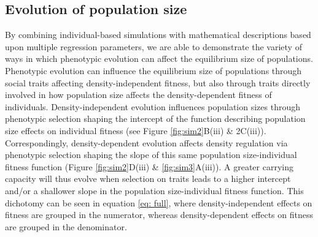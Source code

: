 \documentclass{article}
\begin{document}
\subsection{Evolution of population size}
By combining individual-based simulations with mathematical descriptions based upon multiple regression parameters, we are able to demonstrate the variety of ways in which phenotypic evolution can affect the equilibrium size of populations. Phenotypic evolution can influence the equilibrium size of populations through social traits affecting density-independent fitness, but also through traits directly involved in how population size affects the density-dependent fitness of individuals. Density-independent evolution influences population sizes through phenotypic selection shaping the intercept of the function describing population size effects on individual fitness (see Figure \ref{fig:sim2}B(iii) \& 2C(iii)). Correspondingly, density-dependent evolution affects density regulation via phenotypic selection shaping the slope of this same population size-individual fitness function (Figure \ref{fig:sim2}D(iii) \& \ref{fig:sim3}A(iii)). A greater carrying capacity will thus evolve when selection on traits leads to a higher intercept and/or a shallower slope in the population size-individual fitness function. This dichotomy can be seen in equation \ref{eq: full}, where density-independent effects on fitness are grouped in the numerator, whereas density-dependent effects on fitness are grouped in the denominator.
\end{document}

